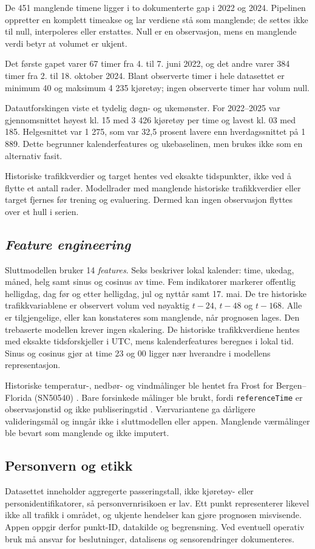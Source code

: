 De 451 manglende timene ligger i to dokumenterte gap i 2022 og 2024. Pipelinen
oppretter en komplett timeakse og lar verdiene stå som manglende; de settes ikke til
null, interpoleres eller erstattes. Null er en observasjon, mens en manglende verdi
betyr at volumet er ukjent.

Det første gapet varer 67 timer fra 4. til 7. juni 2022, og det andre varer 384
timer fra 2. til 18. oktober 2024. Blant observerte timer i hele datasettet er
minimum 40 og maksimum 4 235 kjøretøy; ingen observerte timer har volum null.

Datautforskingen viste et tydelig døgn- og ukemønster. For 2022--2025 var
gjennomsnittet høyest kl. 15 med 3 426 kjøretøy per time og lavest kl. 03 med 185.
Helgesnittet var 1 275, som var 32,5 prosent lavere enn hverdagssnittet på 1 889.
Dette begrunner kalenderfeatures og ukebaselinen, men brukes ikke som en alternativ
fasit.

Historiske trafikkverdier og target hentes ved eksakte tidspunkter, ikke ved å
flytte et antall rader. Modellrader med manglende historiske trafikkverdier eller
target fjernes før trening og evaluering.
Dermed kan ingen observasjon flyttes over et hull i serien.

\subsection{\emph{Feature engineering}}

Sluttmodellen bruker 14 \emph{features}. Seks beskriver lokal kalender: time,
ukedag, måned, helg samt sinus og cosinus av time. Fem indikatorer markerer
offentlig helligdag, dag før og etter helligdag, jul og nyttår samt 17. mai. De tre
historiske trafikkvariablene er observert volum ved nøyaktig
$t-24$, $t-48$ og $t-168$. Alle er tilgjengelige, eller kan konstateres som
manglende, når prognosen lages. Den trebaserte modellen krever ingen skalering.
De historiske trafikkverdiene hentes med eksakte tidsforskjeller i UTC, mens
kalenderfeatures beregnes i lokal tid. Sinus og cosinus gjør at time 23 og 00 ligger nær hverandre i
modellens representasjon.

Historiske temperatur-, nedbør- og vindmålinger ble hentet fra Frost for
Bergen--Florida (SN50540) \cite{frost-howto}. Bare forsinkede målinger ble brukt,
fordi \texttt{referenceTime} er observasjonstid og ikke publiseringstid
\cite{frost-time-concepts}. Værvariantene ga dårligere valideringsmål og inngår ikke
i sluttmodellen eller appen. Manglende værmålinger ble bevart som manglende og ikke
imputert.

\subsection{Personvern og etikk}

Datasettet inneholder aggregerte passeringstall, ikke kjøretøy- eller
personidentifikatorer, så personvernrisikoen er lav. Ett punkt representerer likevel
ikke all trafikk i området, og ukjente hendelser kan gjøre prognosen misvisende.
Appen oppgir derfor punkt-ID, datakilde og begrensning. Ved eventuell operativ bruk
må ansvar for beslutninger, datalisens og sensorendringer dokumenteres.
